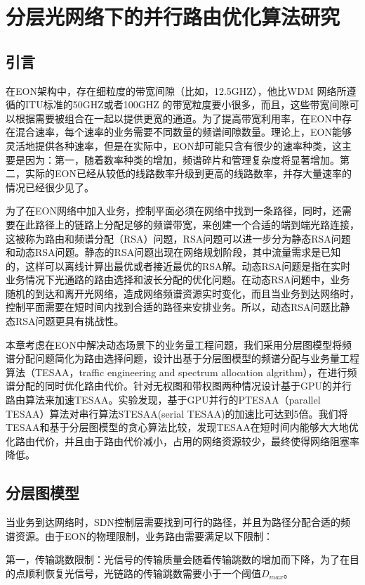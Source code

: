 
\chapter{分层光网络下的并行路由优化算法研究}
\section{引言}
在EON架构中，存在细粒度的带宽间隙（比如，12.5GHZ），他比WDM 网络所遵循的ITU标准的50GHZ或者100GHZ 的带宽粒度要小很多，而且，这些带宽间隙可以根据需要被组合在一起以提供更宽的通道。为了提高带宽利用率，在EON中存在混合速率，每个速率的业务需要不同数量的频谱间隙数量。理论上，EON能够灵活地提供各种速率，但是在实际中，EON却可能只含有很少的速率种类，这主要是因为：第一，随着数率种类的增加，频谱碎片和管理复杂度将显著增加。第二，实际的EON已经从较低的线路数率升级到更高的线路数率，并存大量速率的情况已经很少见了。

为了在EON网络中加入业务，控制平面必须在网络中找到一条路径，同时，还需要在此路径上的链路上分配足够的频谱带宽，来创建一个合适的端到端光路连接，这被称为路由和频谱分配（RSA）问题，RSA问题可以进一步分为静态RSA问题和动态RSA问题。静态的RSA问题出现在网络规划阶段，其中流量需求是已知的，这样可以离线计算出最优或者接近最优的RSA解。动态RSA问题是指在实时业务情况下光通路的路由选择和波长分配的优化问题。在动态RSA问题中，业务随机的到达和离开光网络，造成网络频谱资源实时变化，而且当业务到达网络时，控制平面需要在短时间内找到合适的路径来安排业务。所以，动态RSA问题比静态RSA问题更具有挑战性。

本章考虑在EON中解决动态场景下的业务量工程问题，我们采用分层图模型将频谱分配问题简化为路由选择问题，设计出基于分层图模型的频谱分配与业务量工程算法（TESAA，traffic engineering and spectrum allocation algrithm），在进行频谱分配的同时优化路由代价。针对无权图和带权图两种情况设计基于GPU的并行路由算法来加速TESAA。实验发现，基于GPU并行的PTESAA（parallel TESAA）算法对串行算法STESAA(serial TESAA)的加速比可达到5倍。我们将TESAA和基于分层图模型的贪心算法比较，发现TESAA在短时间内能够大大地优化路由代价，并且由于路由代价减小，占用的网络资源较少，最终使得网络阻塞率降低。
\section{分层图模型}
当业务到达网络时，SDN控制层需要找到可行的路径，并且为路径分配合适的频谱资源。由于EON的物理限制，业务路由需要满足以下限制：

第一，传输跳数限制：光信号的传输质量会随着传输跳数的增加而下降，为了在目的点顺利恢复光信号，光链路的传输跳数需要小于一个阈值$D_{max}$。

